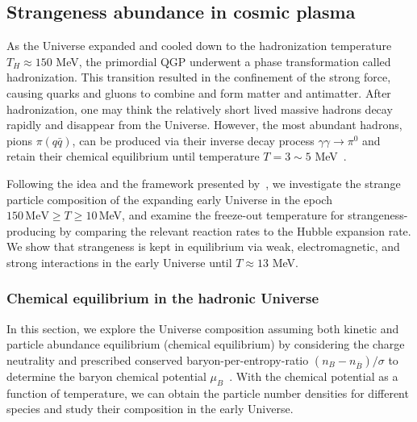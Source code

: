 \subsection{Strangeness abundance in cosmic plasma}
\label{Strangeness}
As the Universe expanded and cooled down to the hadronization temperature $T_H\approx150$ MeV, the primordial QGP underwent a phase transformation called hadronization. This transition resulted in the confinement of the strong force, causing quarks and gluons to combine and form matter 
and antimatter. After hadronization, one may think the relatively short lived massive hadrons decay rapidly and disappear from the Universe. However, the most abundant hadrons, pions $\pi(q\bar q)$, can be produced via their inverse decay process $\gamma\gamma\rightarrow\pi^0$ and retain their chemical equilibrium until temperature $T=3\sim5$ MeV~\cite{Kuznetsova:2008jt}. 

Following the idea and the framework presented by~\cite{Kuznetsova:2008jt}, we investigate the strange particle composition of the expanding early Universe in the epoch $150\,\mathrm{MeV}\ge T\ge 10$\,MeV, and examine the freeze-out temperature for strangeness-producing  by comparing the relevant reaction rates to the Hubble expansion rate. We show that strangeness is kept in equilibrium via weak, electromagnetic, and strong interactions in the early Universe until $T\approx13$ MeV.


 




\subsubsection{Chemical equilibrium in the hadronic Universe}

In this section, we explore the Universe composition assuming both kinetic and particle abundance equilibrium (chemical equilibrium) by considering the charge neutrality and prescribed conserved baryon-per-entropy-ratio ${(n_B-n_{\overline{B}})}/{\sigma}$ to determine the baryon chemical potential $\mu_B$~\cite{Fromerth:2012fe,Rafelski:2013yka}. With the chemical potential as a function of temperature, we can obtain the particle number densities for different species and study their composition in the early Universe.

